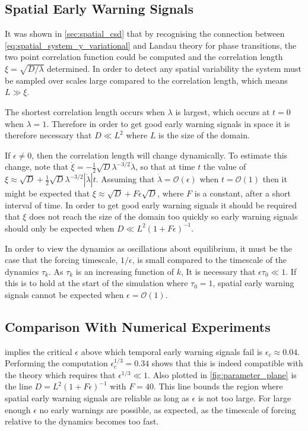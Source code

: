 \subsection{Spatial Early Warning Signals}
It was shown in \cref{sec:spatial_csd} that by recognising the connection between \cref{eq:spatial_system_y_variational} and Landau theory for phase transitions, the two point
correlation function could be computed and the correlation length $\xi = \sqrt{D/\lambda}$ determined. In order to detect any spatial variability the system must be sampled over
scales large compared to the correlation length, which means $L \gg \xi$.

The shortest correlation length occurs when $\lambda$ is largest, which occurs at $t = 0$ when $\lambda = 1$. Therefore in order to get good early
warning signals in space it is therefore necessary that $D \ll L^2$ where $L$ is the size of the domain.

If $\epsilon \neq 0$, then the correlation length will change dynamically. To estimate this change, note that $\dot{\xi} = -\frac{1}{2}\sqrt{D}\lambda^{-3/2} \dot{\lambda}$, so that at time $t$
the value of $\xi \approx \sqrt{D} + \frac{1}{2}\sqrt{D}\lambda^{-3/2} \left|\dot{\lambda}\right|t$. Assuming that $\dot{\lambda} = \mathcal{O}(\epsilon)$ when $t=\mathcal{O}(1)$ then it might be expected
that $\xi \approx \sqrt{D} + F \epsilon \sqrt{D}$, where $F$ is a constant, after a short interval of time. In order to get good early warning signals it should be required that $\xi$ does not reach the
size of the domain too quickly so early warning signals should only be expected when $D \ll L^2 \left(1 + F \epsilon\right)^{-1}$.

In order to view the dynamics as oscillations about equilibrium, it must be the case that the forcing timescale, $1/\epsilon$, is small compared to the timescale
of the dynamics $\tau_k$. As $\tau_k$ is an increasing function of $k$, It is necessary that $\epsilon \tau_0 \ll 1$. If this is to hold at the start of the simulation where
$\tau_0 = 1$, spatial early warning signals cannot be expected when $\epsilon = \mathcal{O}(1)$.

\subsection{Comparison With Numerical Experiments}
 implies the critical $\epsilon$ above which temporal early warning signals fail is $\epsilon_c \approx 0.04$.
Performing the computation $\epsilon_c^{1/3} = 0.34$ shows that this is indeed compatible with the theory which requires that $\epsilon^{1/3} \ll 1$.
Also plotted in \cref{fig:parameter_plane} is the  line $D = L^2 \left(1 + F \epsilon\right)^{-1}$ with $F = 40$.
This  line bounds the region where spatial early warning signals are reliable as long as $\epsilon$ is not too large.
For large enough $\epsilon$ no early warnings are possible, as expected, as the timescale of forcing relative to the dynamics becomes too fast.

